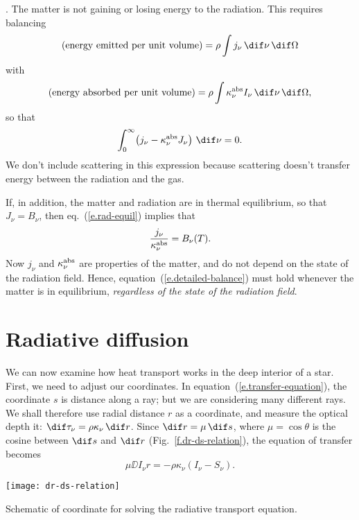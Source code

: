 . 
The matter is not gaining or losing energy to the radiation. This requires balancing
\[ \left(\textrm{energy emitted per unit volume}\right) = \rho\int j_{\nu}\,\dif\nu\,\dif\Omega\] 
with
\[ \left(\textrm{energy absorbed per unit volume}\right) = \rho\int \kapabs I_{\nu}\,\dif\nu\,\dif\Omega,\]
so that
\begin{equation}\label{e.rad-equil}
\int_{0}^{\infty}\! \left(j_{\nu} - \kapabs J_{\nu}\right)\,\dif\nu = 0.
\end{equation}
We don't include scattering in this expression because scattering doesn't transfer energy between the radiation and the gas.

If, in addition, the matter and radiation are in thermal equilibrium, so that $J_{\nu} = B_{\nu}$, then eq.~(\ref{e.rad-equil}) implies that
\begin{equation}\label{e.detailed-balance}
\frac{j_{\nu}}{\kappa_\nu^{\mathrm{abs}}} = B_{\nu}(T).
\end{equation}
Now $j_{\nu}$ and $\kappa_\nu^{\mathrm{abs}}$ are properties of the matter, and do not depend on the state of the radiation field. Hence, equation~(\ref{e.detailed-balance}) must hold whenever the matter is in equilibrium, \emph{regardless of the state of the radiation field}.

\section{Radiative diffusion}

We can now examine how heat transport works in the deep interior of a star. First, we need to adjust our coordinates. In equation~(\ref{e.transfer-equation}), the coordinate $s$ is distance along a ray; but we are considering many different rays. We shall therefore use radial distance $r$ as a coordinate, and measure the optical depth it: $\dif\tau_{\nu} = \rho\kappa_{\nu}\,\dif r$. 
Since $\dif r = \mu\,\dif s$, where $\mu=\cos\theta$ is the cosine between $\dif s$ and $\dif r$ (Fig.~\ref{f.dr-ds-relation}), the equation of transfer becomes
\begin{equation}
\mu\DD{I_{\nu}}{r} = -\rho\kappa_{\nu}\left(I_{\nu} - S_{\nu}\right).
\end{equation}
\begin{marginfigure}
\texttt{[image: dr-ds-relation]}
\caption{\label{f.dr-ds-relation} Schematic of coordinate for solving the radiative transport equation.}
\end{marginfigure}

